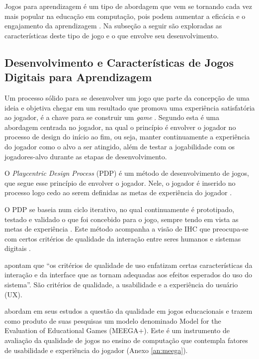 Jogos para aprendizagem é um tipo de abordagem que vem se tornando cada vez mais popular na educação em computação, pois podem aumentar a eficácia e o engajamento da aprendizagem \cite{battistella, brito, sales_climaco2016, queiroz}. Na subseção a seguir são exploradas as características deste tipo de jogo e o que envolve seu desenvolvimento.

\subsection{Desenvolvimento e Características de Jogos Digitais para Aprendizagem}

Um processo sólido para se desenvolver um jogo que parte da concepção de uma ideia e objetiva chegar em um resultado que promova uma experiência satisfatória ao jogador, é a chave para se construir um \textit{game} \cite[p. 10-11]{Fullerton_2008}.  Segundo  esta é uma abordagem centrada no jogador, na qual o princípio é envolver o jogador no processo de design do início ao fim, ou seja, manter continuamente a experiência do jogador como o alvo a ser atingido, além de testar a jogabilidade com os jogadores-alvo durante as etapas de desenvolvimento.

O \textit{Playcentric Design Process} (PDP) é um método de desenvolvimento de jogos, que segue esse princípio de envolver o jogador. Nele, o jogador é inserido no processo logo cedo ao serem definidas as metas de experiência do jogador \cite{Fullerton_2008}.

O PDP se baseia num ciclo iterativo, no qual continuamente é prototipado, testado e validado o que foi concebido para o jogo, sempre tendo em vista as metas de experiência \cite[p. 10-11]{Fullerton_2008}. Este método acompanha a visão de IHC que preocupa-se com certos critérios de qualidade da interação entre seres humanos e sistemas digitais \cite[p. 8-10]{BarbosaEtAl2021}.

 apontam que ``os critérios de qualidade de uso enfatizam certas características da interação e da interface que as tornam adequadas aos efeitos esperados do uso do sistema''. São critérios de qualidade, a usabilidade e a experiência do usuário (UX).

 abordam em seus estudos a questão da qualidade em jogos educacionais e trazem como produto de suas pesquisas um modelo denominado Model for the Evaluation of Educational Games (MEEGA+). Este é um instrumento de avaliação da qualidade de jogos no ensino de computação que contempla fatores de usabilidade e experiência do jogador (Anexo \ref{an:meega}).


